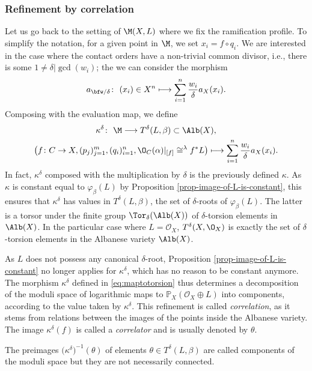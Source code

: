 \subsubsection{Refinement by correlation}\label{sec:correlationrefinement}
Let us go back to the setting of $\M(X,L)$ where we fix the ramification profile. To simplify the notation, for a given point in $\M$, we set $x_i=f\circ q_i$. We are interested in the case where the contact orders have a non-trivial common divisor, i.e., there is some $1\neq\delta|\gcd(w_i)$; the we can consider the morphism
\[ a_{\bfw/\delta}\colon\ (x_i)\in X^n\longmapsto \sum_{i=1}^n \frac{w_i}{\delta}a_X(x_i). \]
Composing with the evaluation map, we define
\begin{gather}
 \kappa^\delta \colon\ \M \longrightarrow T^\delta(L,\beta)\subset\Alb(X), \nonumber\\
 \bigl(f\colon C\to X,(p_j)_{j=1}^m,(q_i)_{i=1}^n, \O_C(\alpha)\rvert_{[f]}\cong^{\lambda}f^*L\bigr) \longmapsto \sum_{i=1}^n\frac{w_i}{\delta} a_X (x_i)
.\label{eq:maptotorsion}
\end{gather}
In fact, $\kappa^\delta$ composed with the multiplication by $\delta$ is the previously defined $\kappa$. As $\kappa$ is constant equal to $\varphi_\beta(L)$ by Proposition \ref{prop-image-of-L-is-constant}, this ensures that $\kappa^\delta$ has values in $ T^\delta(L,\beta)$, the set of $\delta$-roots of $\varphi_\beta(L)$. The latter is a torsor under the finite group $\Tor_\delta(\Alb(X))$ of $\delta$-torsion elements in~$\Alb(X)$. In the particular case where $L=\mathcal O_X$, $T^\delta(X,\O_X)$ is exactly the set of $\delta$-torsion elements in the Albanese variety $\Alb(X)$.



As $L$ does not possess any canonical $\delta$-root, Proposition \ref{prop-image-of-L-is-constant} no longer applies for $\kappa^\delta$, which has no reason to be constant anymore. The morphism $\kappa^\delta$ defined in \eqref{eq:maptotorsion} thus determines a decomposition of the moduli space of logarithmic maps to $\mathbb P_X(\mathcal O_X\oplus L)$ into components, according to the value taken by $\kappa^\delta$. This refinement is called \textit{correlation}, as it stems from relations between the images of the points inside the Albanese variety. The image $\kappa^\delta(f)$ is called a \textit{correlator} and is usually denoted by $\theta$.

\begin{remarkk}
 The preimages $\bigl(\kappa^\delta\bigr)^{-1}(\theta)$ of elements $\theta\in T^\delta(L,\beta)$ are called components of the moduli space but they are not necessarily connected.
\end{remarkk}

